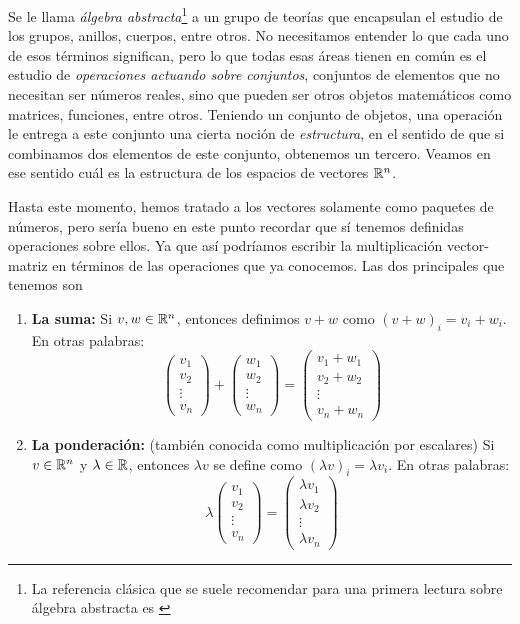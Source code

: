 Se le llama \textit{álgebra abstracta}\footnote{La referencia clásica que se suele recomendar para una primera lectura sobre álgebra abstracta es \cite{dummit2003abstract}} a un grupo de teorías que encapsulan el estudio de los grupos, anillos, cuerpos, entre otros. No necesitamos entender lo que cada uno de esos términos significan, pero lo que todas esas áreas tienen en común es el estudio de \textit{operaciones actuando sobre conjuntos}, conjuntos de elementos que no necesitan ser números reales, sino que pueden ser otros objetos matemáticos como matrices, funciones, entre otros. Teniendo un conjunto de objetos, una operación le entrega a este conjunto una cierta noción de \textit{estructura}, en el sentido de que si combinamos dos elementos de este conjunto, obtenemos un tercero. Veamos en ese sentido cuál es la estructura de los espacios de vectores $\mathbb{R}^n$.

Hasta este momento, hemos tratado a los vectores solamente como paquetes de números, pero sería bueno en este punto recordar que sí tenemos definidas operaciones sobre ellos. Ya que así podríamos escribir la multiplicación vector-matriz en términos de las operaciones que ya conocemos. Las dos principales que tenemos son
\begin{enumerate}
    \item \textbf{La suma:} Si $v, w \in \mathbb{R}^n$, entonces definimos $v + w$ como $(v + w)_i = v_i + w_i$. En otras palabras:
    \[\begin{pmatrix}
        v_1 \\ v_2 \\ \vdots \\ v_n
    \end{pmatrix} + \begin{pmatrix}
        w_1 \\ w_2 \\ \vdots \\ w_n
    \end{pmatrix} = \begin{pmatrix}
        v_1 + w_1 \\ v_2 + w_2 \\ \vdots \\ v_n + w_n
    \end{pmatrix}\]
    \item \textbf{La ponderación:} (también conocida como multiplicación por escalares) Si $v \in \mathbb{R}^n$ y $\lambda \in \mathbb{R}$, entonces $\lambda v$ se define como $(\lambda v)_i = \lambda v_i$. En otras palabras:
    \[\lambda \begin{pmatrix}
        v_1 \\ v_2 \\ \vdots \\ v_n
    \end{pmatrix} = \begin{pmatrix}
        \lambda v_1 \\ \lambda v_2 \\ \vdots \\ \lambda v_n
    \end{pmatrix}\]
\end{enumerate}

